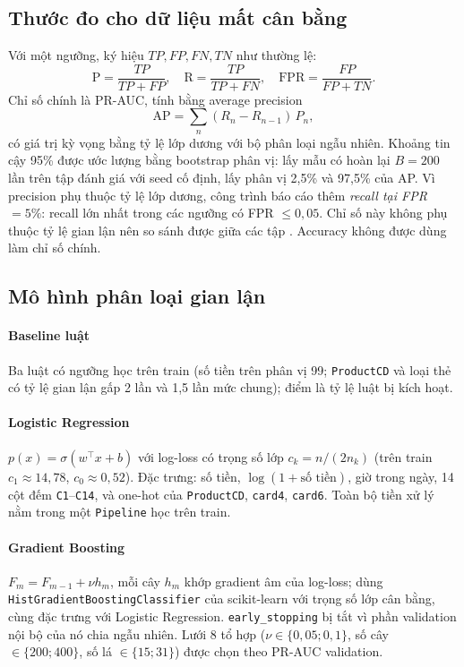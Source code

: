 \documentclass[11pt,a4paper]{article}
\theoremstyle{definition}
\theoremstyle{remark}
\newcommand{\code}[1]{\texttt{#1}}
\numberwithin{equation}{section}
\begin{document}
\subsection{Thước đo cho dữ liệu mất cân bằng}
Với một ngưỡng, ký hiệu $TP, FP, FN, TN$ như thường lệ:
\begin{equation}
\text{P}=\frac{TP}{TP+FP},\quad \text{R}=\frac{TP}{TP+FN},\quad \text{FPR}=\frac{FP}{FP+TN}.
\end{equation}
Chỉ số chính là PR-AUC, tính bằng average precision
\begin{equation}
\text{AP}=\sum_n (R_n-R_{n-1})\,P_n,
\end{equation}
có giá trị kỳ vọng bằng tỷ lệ lớp dương với bộ phân loại ngẫu nhiên. Khoảng tin cậy 95\% được ước lượng bằng bootstrap phân vị: lấy mẫu có hoàn lại $B=200$ lần trên tập đánh giá với seed cố định, lấy phân vị 2,5\% và 97,5\% của AP. Vì precision phụ thuộc tỷ lệ lớp dương, công trình báo cáo thêm \emph{recall tại FPR} $=5\%$: recall lớn nhất trong các ngưỡng có FPR $\le 0{,}05$. Chỉ số này không phụ thuộc tỷ lệ gian lận nên so sánh được giữa các tập \cite{jesus}. Accuracy không được dùng làm chỉ số chính.

\subsection{Mô hình phân loại gian lận}\label{sec:models}
\paragraph{Baseline luật} Ba luật có ngưỡng học trên train (số tiền trên phân vị 99; \code{ProductCD} và loại thẻ có tỷ lệ gian lận gấp 2 lần và 1,5 lần mức chung); điểm là tỷ lệ luật bị kích hoạt.

\paragraph{Logistic Regression} $p(x)=\sigma(w^\top x+b)$ với log-loss có trọng số lớp $c_k=n/(2n_k)$ (trên train $c_1\approx 14{,}78$, $c_0\approx 0{,}52$). Đặc trưng: số tiền, $\log(1+\text{số tiền})$, giờ trong ngày, 14 cột đếm \code{C1}--\code{C14}, và one-hot của \code{ProductCD}, \code{card4}, \code{card6}. Toàn bộ tiền xử lý nằm trong một \code{Pipeline} học trên train.

\paragraph{Gradient Boosting} $F_m=F_{m-1}+\nu h_m$, mỗi cây $h_m$ khớp gradient âm của log-loss; dùng \code{HistGradientBoostingClassifier} của scikit-learn với trọng số lớp cân bằng, cùng đặc trưng với Logistic Regression. \code{early\_stopping} bị tắt vì phần validation nội bộ của nó chia ngẫu nhiên. Lưới 8 tổ hợp ($\nu\in\{0{,}05;0{,}1\}$, số cây $\in\{200;400\}$, số lá $\in\{15;31\}$) được chọn theo PR-AUC validation.
\end{document}
